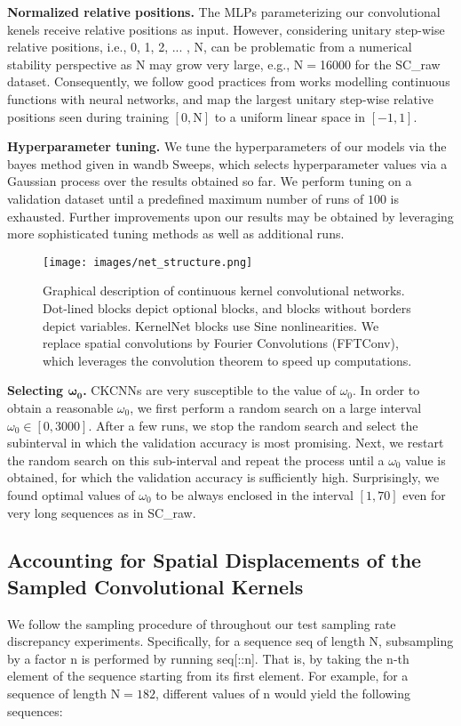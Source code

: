 \documentclass{article}
\def\Nt{\mathrm{N}}
\newcommand{\mlp}{{\btt MLP}}
\begin{document}
\textbf{Normalized relative positions.} The \mlp s parameterizing our convolutional kenels receive relative positions as input. However, considering unitary step-wise relative positions, i.e., 0, 1, 2, ... , $\Nt$, can be problematic from a numerical stability perspective as $\Nt$ may grow very large, e.g., $\Nt{=}$16000 for the SC\_raw dataset. Consequently, we follow good practices from works modelling continuous functions with neural networks, and map the largest unitary step-wise relative positions seen during training $[0, \Nt]$ to a uniform linear space in $[-1, 1]$. 

\textbf{Hyperparameter tuning.} We tune the hyperparameters of our models via the {\btt bayes} method given in {\btt wandb} Sweeps, which selects hyperparameter values via a Gaussian process over the results obtained so far. We perform tuning on a validation dataset until a predefined maximum number of runs of $100$ is exhausted. Further improvements upon our results may be obtained by leveraging more sophisticated tuning methods as well as additional runs. 
 \begin{figure}
     \centering
     \texttt{[image: images/net\_structure.png]}
     \vspace{-4mm}
     \caption{Graphical description of continuous kernel convolutional networks. Dot-lined blocks depict optional blocks, and blocks without borders depict variables. {\btt KernelNet} blocks use $\mathrm{Sine}$ nonlinearities. We replace spatial convolutions by Fourier Convolutions ({\btt FFTConv}), which leverages the convolution theorem to speed up computations.
     \vspace{-2mm}}
     \label{fig:ckcnn_structure}
 \end{figure}

\textbf{Selecting $\boldsymbol{\omega_0}$.} CKCNNs are very susceptible to the value of $\omega_0$. In order to obtain a reasonable $\omega_0$, we first perform a random search on a large interval $\omega_0 \in [0, 3000]$. After a few runs, we stop the random search and select the subinterval in which the validation accuracy is most promising. Next, we restart the random search on this sub-interval and repeat the process until a $\omega_0$ value is obtained, for which the validation accuracy is sufficiently high. Surprisingly, we found optimal values of $\omega_0$ to be always enclosed in the interval $[1, 70]$ even for very long sequences as in SC\_raw.

\subsection{Accounting for Spatial Displacements of the Sampled Convolutional Kernels}\label{appx:spatialdisplacement}
We follow the sampling procedure of
\citet{gu2020hippo} throughout our test sampling rate discrepancy experiments. Specifically, for a sequence {\btt seq} of length $\Nt$, subsampling by a factor {\btt n} is performed by running {\btt seq[::n]}. That is, by taking the {\btt n}-th element of the sequence starting from its first element. For example, for a sequence of length $\Nt{=}182$, different values of {\btt n} would yield the following sequences:
\end{document}

